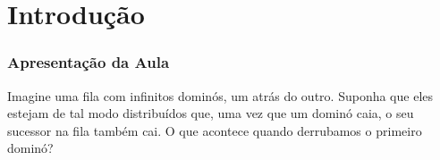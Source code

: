 
\section{Introdução}

\begin{frame}  \frametitle{Apresentação da Aula}

Imagine uma fila com infinitos dominós, um atrás do outro. Suponha
que eles estejam de tal modo distribuídos que, uma vez que um dominó
caia, o seu sucessor na fila também cai. O que acontece quando
derrubamos o primeiro dominó?
\end{frame}
